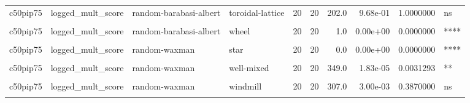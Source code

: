 \documentclass[
]{book}
\begin{document}
\begin{table}
\begin{tabular}{l|l|l|l|r|r|r|r|r|l}
\hline
\cellcolor{gray!6}{c50pip75} & \cellcolor{gray!6}{logged\_mult\_score} & \cellcolor{gray!6}{random-barabasi-albert} & \cellcolor{gray!6}{star} & \cellcolor{gray!6}{20} & \cellcolor{gray!6}{20} & \cellcolor{gray!6}{0.0} & \cellcolor{gray!6}{0.00e+00} & \cellcolor{gray!6}{0.0000000} & \cellcolor{gray!6}{****}\\
\hline
c50pip75 & logged\_mult\_score & random-barabasi-albert & toroidal-lattice & 20 & 20 & 202.0 & 9.68e-01 & 1.0000000 & ns\\
\hline
\cellcolor{gray!6}{c50pip75} & \cellcolor{gray!6}{logged\_mult\_score} & \cellcolor{gray!6}{random-barabasi-albert} & \cellcolor{gray!6}{well-mixed} & \cellcolor{gray!6}{20} & \cellcolor{gray!6}{20} & \cellcolor{gray!6}{388.0} & \cellcolor{gray!6}{0.00e+00} & \cellcolor{gray!6}{0.0000010} & \cellcolor{gray!6}{****}\\
\hline
c50pip75 & logged\_mult\_score & random-barabasi-albert & wheel & 20 & 20 & 1.0 & 0.00e+00 & 0.0000000 & ****\\
\hline
\cellcolor{gray!6}{c50pip75} & \cellcolor{gray!6}{logged\_mult\_score} & \cellcolor{gray!6}{random-barabasi-albert} & \cellcolor{gray!6}{windmill} & \cellcolor{gray!6}{20} & \cellcolor{gray!6}{20} & \cellcolor{gray!6}{365.0} & \cellcolor{gray!6}{1.10e-06} & \cellcolor{gray!6}{0.0002339} & \cellcolor{gray!6}{***}\\
\hline
c50pip75 & logged\_mult\_score & random-waxman & star & 20 & 20 & 0.0 & 0.00e+00 & 0.0000000 & ****\\
\hline
\cellcolor{gray!6}{c50pip75} & \cellcolor{gray!6}{logged\_mult\_score} & \cellcolor{gray!6}{random-waxman} & \cellcolor{gray!6}{toroidal-lattice} & \cellcolor{gray!6}{20} & \cellcolor{gray!6}{20} & \cellcolor{gray!6}{118.0} & \cellcolor{gray!6}{2.60e-02} & \cellcolor{gray!6}{1.0000000} & \cellcolor{gray!6}{ns}\\
\hline
c50pip75 & logged\_mult\_score & random-waxman & well-mixed & 20 & 20 & 349.0 & 1.83e-05 & 0.0031293 & **\\
\hline
\cellcolor{gray!6}{c50pip75} & \cellcolor{gray!6}{logged\_mult\_score} & \cellcolor{gray!6}{random-waxman} & \cellcolor{gray!6}{wheel} & \cellcolor{gray!6}{20} & \cellcolor{gray!6}{20} & \cellcolor{gray!6}{0.0} & \cellcolor{gray!6}{0.00e+00} & \cellcolor{gray!6}{0.0000000} & \cellcolor{gray!6}{****}\\
\hline
c50pip75 & logged\_mult\_score & random-waxman & windmill & 20 & 20 & 307.0 & 3.00e-03 & 0.3870000 & ns\\
\hline
\cellcolor{gray!6}{c50pip75} & \cellcolor{gray!6}{logged\_mult\_score} & \cellcolor{gray!6}{star} & \cellcolor{gray!6}{toroidal-lattice} & \cellcolor{gray!6}{20} & \cellcolor{gray!6}{20} & \cellcolor{gray!6}{400.0} & \cellcolor{gray!6}{0.00e+00} & \cellcolor{gray!6}{0.0000000} & \cellcolor{gray!6}{****}\\

\end{tabular}
\end{table}
\end{document}
